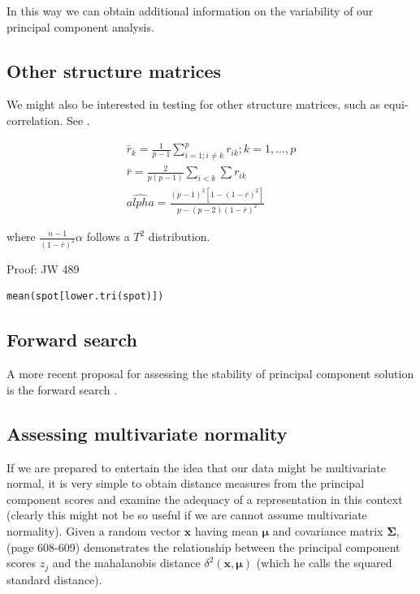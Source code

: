 In this way we can obtain additional information on the variability of our principal component analysis.




\subsection{Other structure matrices}


We might also be interested in testing for other structure matrices, such as equi-correlation.   See \cite{Lawley:1963}.

\begin{eqnarray*}
\bar{r}_{k} = \frac{1}{p-1} \sum_{i=1; i \neq k}^{p} r_{ik}; k = 1, \ldots, p\\
\bar{r} = \frac{2}{p(p-1)} \sum_{i<k} \sum r_{ik}\\
\hat{alpha} = \frac{(p-1)^{2} \left[ 1 - (1 - \bar{r})^{2} \right] }{
p - (p - 2)(1 - \bar{r})^{2}}
\end{eqnarray*}

where $\frac{n-1}{(1-\bar{r})^{2}} \alpha$ follows a $T^{2}$ distribution.

Proof: JW 489  

\begin{verbatim}
mean(spot[lower.tri(spot)])
\end{verbatim}




\subsection{Forward search}

A more recent proposal for assessing the stability of principal component solution is the forward search \cite{Atkinson+etal:2004}.


\subsection{Assessing multivariate normality}
\label{mahalpca}

If we are prepared to entertain the idea that our data might be multivariate normal, it is very simple to obtain distance measures from the principal component scores and examine the adequacy of a representation in this context (clearly this might not be so useful if we are cannot assume multivariate normality).   Given a random vector $\boldsymbol{x}$ having mean $\boldsymbol{\mu}$ and covariance matrix $\boldsymbol{\Sigma}$, \cite{Flury:1997} (page 608-609) demonstrates the relationship between the principal component scores $z_{j}$ and the mahalanobis distance $\delta^{2}(\boldsymbol{x}, \boldsymbol{\mu})$ (which he calls the squared standard distance).   

